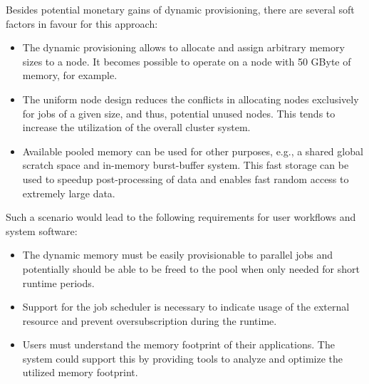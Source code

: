 \documentclass{../../template/esiwace-report}
\begin{document}
Besides potential monetary gains of dynamic provisioning, there are several soft factors in favour for this approach:
\begin{itemize}
\item The dynamic provisioning allows to allocate and assign arbitrary memory sizes to a node. It becomes possible to operate on a node with 50 GByte of memory, for example.
\item The uniform node design reduces the conflicts in allocating nodes exclusively for jobs of a given size, and thus, potential unused nodes. This tends to increase the utilization of the overall cluster system.
\item Available pooled memory can be used for other purposes, e.g., a shared global scratch space and in-memory burst-buffer system.
This fast storage can be used to speedup post-processing of data and enables fast random access to extremely large data.
\end{itemize}

Such a scenario would lead to the following requirements for user workflows and system software:
\begin{itemize}
\item The dynamic memory must be easily provisionable to parallel jobs and potentially should be able to be freed to the pool when only needed for short runtime periods.
\item Support for the job scheduler is necessary to indicate usage of the external resource and prevent oversubscription during the runtime.
\item Users must understand the memory footprint of their applications.
The system could support this by providing tools to analyze and optimize the utilized memory footprint.
\end{itemize}
\end{document}
